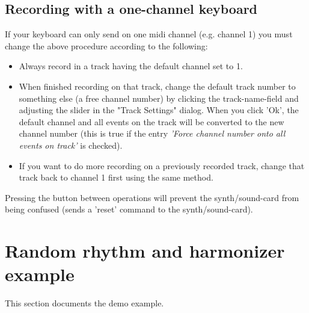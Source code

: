 \documentclass[letterpaper]{report}
\begin{document}
\subsection{Recording with a one-channel keyboard}\label{onechannel}

If your keyboard can only send on one midi channel (e.g. channel 1) you must
change the above procedure according to the following:

\begin{itemize}

\item Always record in a track having the default channel set to 1.

\item When finished recording on that track, change the default track number
to something else (a free channel number) by clicking the track-name-field
and adjusting the slider in the "Track Settings" dialog. When you click
'Ok', the default channel and all events on the track will be converted to
the new channel number (this is true if the entry
{\em 'Force channel number onto all events on track'} is checked).

\item If you want to do more recording on a previously recorded track, change
that track back to channel 1 first using the same method.

\end{itemize}

Pressing the  button between operations will
prevent the synth/sound-card from being confused (sends a 'reset' command
to the synth/sound-card).


\section{Random rhythm and harmonizer example}

This section documents the demo example.
\end{document}

